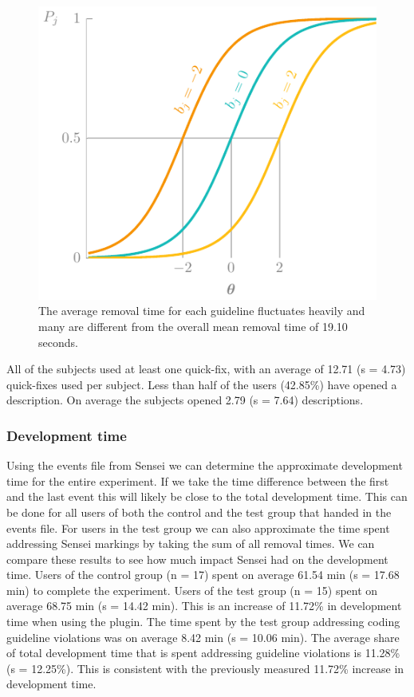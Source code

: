 \begin{figure}
  \centering
  \includegraphics[page=19]{03-education/figures/tikzfigures.pdf}
  \caption[Average removal time of guidelines]{The average removal time for each guideline fluctuates heavily and many are different from the overall mean removal time of 19.10 seconds.}
  \label{fig:fixtimes}
\end{figure}

All of the subjects used at least one quick-fix, with an average of 12.71 (s = 4.73) quick-fixes used per subject.
Less than half of the users (42.85\%) have opened a description.
On average the subjects opened 2.79 (s = 7.64) descriptions.

\subsubsection{Development time}
Using the events file from Sensei we can determine the approximate development time for the entire experiment.
If we take the time difference between the first and the last event this will likely be close to the total development time.
This can be done for all users of both the control and the test group that handed in the events file.
For users in the test group we can also approximate the time spent addressing Sensei markings by taking the sum of all removal times.
We can compare these results to see how much impact Sensei had on the development time.
Users of the control group (n = 17) spent on average 61.54 min (s = 17.68 min) to complete the experiment.
Users of the test group (n = 15) spent on average 68.75 min (s = 14.42 min).
This is an increase of 11.72\% in development time when using the plugin.
The time spent by the test group addressing coding guideline violations was on average 8.42 min (s = 10.06 min).
The average share of total development time that is spent addressing guideline violations is 11.28\% (s = 12.25\%).
This is consistent with the previously measured 11.72\% increase in development time.

